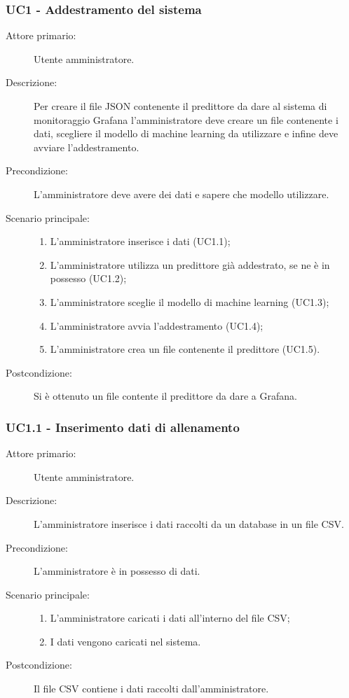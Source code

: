\subsubsection{UC1 - Addestramento del sistema}
\label{sssec:uc1}

\begin{description}
  \item[Attore primario:] Utente amministratore.
  \item[Descrizione:] Per creare il file JSON contenente il predittore da dare al sistema di monitoraggio Grafana l'amministratore deve creare un file contenente i dati, scegliere il modello di machine learning da utilizzare e infine deve avviare l'addestramento.
  \item[Precondizione:] L'amministratore deve avere dei dati e sapere che modello utilizzare.
  \item[Scenario principale:]
  \begin{enumerate}
    \item L'amministratore inserisce i dati (UC1.1);
    \item L'amministratore utilizza un predittore già addestrato, se ne è in possesso (UC1.2);
    \item L'amministratore sceglie il modello di machine learning (UC1.3);
    \item L'amministratore avvia l'addestramento (UC1.4);
    \item L'amministratore crea un file contenente il predittore (UC1.5).
  \end{enumerate}
  \item[Postcondizione:] Si è ottenuto un file contente il predittore da dare a Grafana.
\end{description}

\subsubsection{UC1.1 - Inserimento dati di allenamento}
\label{sssec:uc1.1}
\begin{description}
  \item[Attore primario:] Utente amministratore.
  \item[Descrizione:] L'amministratore inserisce i dati raccolti da un database in un file CSV.
  \item[Precondizione:] L'amministratore è in possesso di dati.
  \item[Scenario principale:]
  \begin{enumerate}
    \item L'amministratore caricati i dati all'interno del file CSV;
    \item I dati vengono caricati nel sistema.
  \end{enumerate}
  \item[Postcondizione:] Il file CSV contiene i dati raccolti dall'amministratore.
\end{description}

